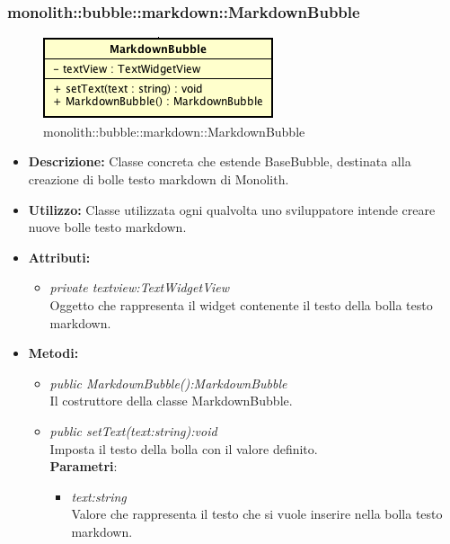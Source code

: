 \subsubsection{monolith::bubble::markdown::MarkdownBubble}

\label{monolith::bubble::markdown::MarkdownBubble}
\begin{figure}[H]
	\centering
	\includegraphics[scale=0.5]{Sezioni/SottosezioniST/img/MarkdownBubble.png}
	\caption{monolith::bubble::markdown::MarkdownBubble}
\end{figure}

\begin{itemize}
\item \textbf{Descrizione:} Classe concreta che estende BaseBubble, destinata alla creazione di bolle testo markdown di Monolith.
\item \textbf{Utilizzo:} Classe utilizzata ogni qualvolta uno sviluppatore intende creare nuove bolle testo markdown.
\item \textbf{Attributi:}
\begin{itemize}
\item \textit{private textview:TextWidgetView}\\
Oggetto che rappresenta il widget contenente il testo della bolla testo markdown.
\end{itemize}
\item \textbf{Metodi:}
\begin{itemize}
\item \textit{public MarkdownBubble():MarkdownBubble}\\
Il costruttore della classe MarkdownBubble.
\item \textit{public setText(text:string):void}\\
Imposta il testo della bolla con il valore definito.
\\ \textbf{Parametri}: \begin{itemize}
\item \textit{text:string}\\
Valore che rappresenta il testo che si vuole inserire nella bolla testo markdown.
\end{itemize}
\end{itemize}
\end{itemize}

